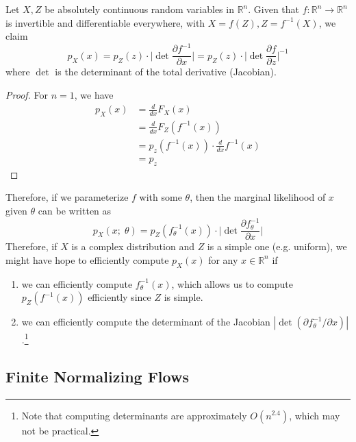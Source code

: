 \documentclass{article}
\begin{document}
  \begin{lemma}[Jacobi] 
    Let $X, Z$ be absolutely continuous random variables in $\mathbb{R}^n$. 
    Given that $f: \mathbb{R}^n \rightarrow \mathbb{R}^n$ is invertible and differentiable everywhere, with $X = f(Z), Z = f^{-1} (X)$, we claim 
    \begin{equation}
      p_X (x) = p_Z (z) \cdot \bigg| \det \frac{\partial f^{-1}}{\partial x} \bigg| = p_Z (z) \cdot \bigg| \det \frac{\partial f}{\partial z}  \bigg|^{-1}
    \end{equation} 
    where $\det$ is the determinant of the total derivative (Jacobian). 
  \end{lemma}
  \begin{proof}
    For $n = 1$, we have 
    \begin{align}
      p_X (x) & = \frac{d}{dx} F_X (x) \\
              & = \frac{d}{dx} F_Z (f^{-1}(x)) \\
              & = p_z (f^{-1} (x)) \cdot \frac{d}{dx} f^{-1} (x)  \\
              & = p_z 
    \end{align}
  \end{proof} 

  Therefore, if we parameterize $f$ with some $\theta$, then the marginal likelihood of $x$ given $\theta$ can be written as 
  \begin{equation}
    p_X (x;\; \theta) = p_Z (f^{-1}_\theta (x)) \cdot \bigg| \det \frac{\partial f_\theta^{-1}}{\partial x} \bigg|
  \end{equation} 
  Therefore, if $X$ is a complex distribution and $Z$ is a simple one (e.g. uniform), we might have hope to efficiently compute $p_X (x)$ for any $x \in \mathbb{R}^n$ if 
  \begin{enumerate}
    \item we can efficiently compute $f^{-1}_\theta (x)$, which allows us to compute $p_Z (f^{-1} (x))$ efficiently since $Z$ is simple. 
    \item we can efficiently compute the determinant of the Jacobian $|\det (\partial f_\theta^{-1}/\partial x)|$.\footnote{Note that computing determinants are approximately $O(n^{2.4})$, which may not be practical. } 
  \end{enumerate}  

\subsection{Finite Normalizing Flows}
\end{document}
